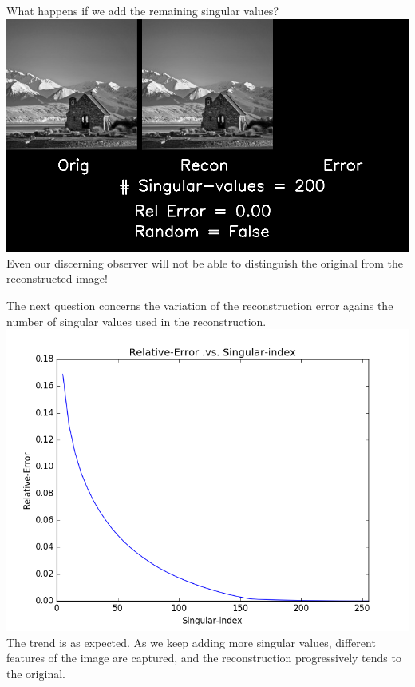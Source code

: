 \documentclass{article}
\begin{document}
What happens if we add the remaining singular values?\\

\includegraphics[width =\textwidth]{SVD/a/Square/False/recon0200.png}\\

Even our discerning observer will not be able to distinguish the original from the reconstructed image!

The next question concerns the variation of the reconstruction error agains the number of singular values used in the reconstruction.\\

\includegraphics[width =\textwidth]{SVD/a/Square/False/error.png}\\

The trend is as expected. As we keep adding more singular values, different features of the image are captured, and the reconstruction progressively tends to the original.
\end{document}
